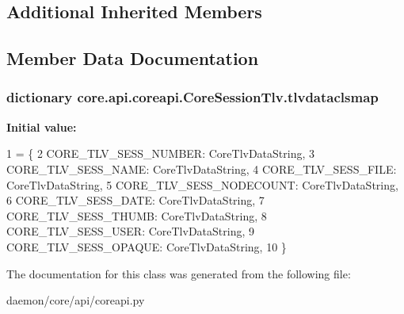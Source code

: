 \subsection*{Additional Inherited Members}


\subsection{Member Data Documentation}
\hypertarget{classcore_1_1api_1_1coreapi_1_1_core_session_tlv_a526c7797eac8902f694ebe5f956a18de}{
\subsubsection[{tlvdataclsmap}]{\setlength{\rightskip}{0pt plus 5cm}dictionary core.\+api.\+coreapi.\+Core\+Session\+Tlv.\+tlvdataclsmap\hspace{0.3cm}{\ttfamily [static]}}}\label{classcore_1_1api_1_1coreapi_1_1_core_session_tlv_a526c7797eac8902f694ebe5f956a18de}
{\bfseries Initial value\+:}
\begin{DoxyCode}
1 = \{
2         CORE\_TLV\_SESS\_NUMBER: CoreTlvDataString,
3         CORE\_TLV\_SESS\_NAME: CoreTlvDataString,
4         CORE\_TLV\_SESS\_FILE: CoreTlvDataString,
5         CORE\_TLV\_SESS\_NODECOUNT: CoreTlvDataString,
6         CORE\_TLV\_SESS\_DATE: CoreTlvDataString,
7         CORE\_TLV\_SESS\_THUMB: CoreTlvDataString,
8         CORE\_TLV\_SESS\_USER: CoreTlvDataString,
9         CORE\_TLV\_SESS\_OPAQUE: CoreTlvDataString,
10     \}
\end{DoxyCode}


The documentation for this class was generated from the following file\+:\begin{DoxyCompactItemize}
\item 
daemon/core/api/coreapi.\+py\end{DoxyCompactItemize}
